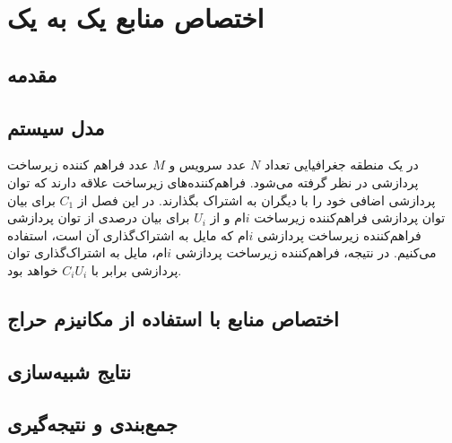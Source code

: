 \chapter{اختصاص منابع یک به یک}\label{Chap:one_to_one_allocation}
  \thispagestyle{empty}
  \section{مقدمه}
  \section{مدل سیستم}
  در یک منطقه جغرافیایی تعداد $N$ عدد سرویس و $M$ عدد فراهم کننده زیرساخت پردازشی در نظر گرفته می‌شود.
  فراهم‌کننده‌های زیرساخت علاقه دارند که توان پردازشی اضافی خود را با دیگران به اشتراک بگذارند.
  در این فصل از $C_1$ برای بیان توان پردازشی فراهم‌کننده زیرساخت $i$ام و از $U_i$ برای بیان درصدی از توان پردازشی فراهم‌کننده زیرساخت پردازشی $i$ام که مایل به اشتراک‌گذاری آن است، استفاده می‌کنیم.
  در نتیجه، فراهم‌کننده زیرساخت پردازشی $i$ام، مایل به اشتراک‌گذاری توان پردازشی برابر با $C_iU_i$ خواهد بود.

  \section{اختصاص منابع با استفاده از مکانیزم حراج}
  \section{نتایج شبیه‌سازی}
  \section{جمع‌بندی و نتیجه‌گیری}
    